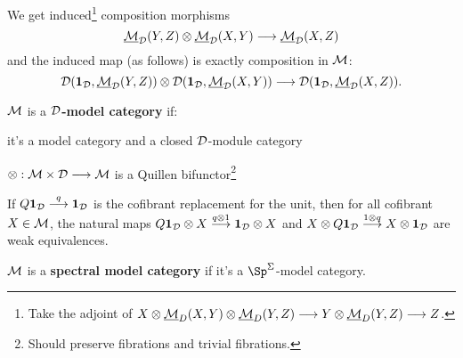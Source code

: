 \documentclass[11pt]{article}
\begin{document}
\begin{MichaelStableModelCats}
\begin{itemise}
We get induced\footnote{Take the adjoint of 
$X\otimes \underline{\mathcal{M}}_D(X,Y)\otimes\underline{\mathcal{M}}_D(Y,Z)\longrightarrow Y\otimes\underline{\mathcal{M}}_D(Y,Z)\longrightarrow Z$.} composition morphisms
\[\underline{\mathcal{M}}_{\mathcal{D}}(Y,Z)\otimes\underline{\mathcal{M}}_{\mathcal{D}}(X,Y)\longrightarrow
\underline{\mathcal{M}}_{\mathcal{D}}(X,Z)\]
and the induced map (as follows) is exactly composition in $\mathcal{M}$:
\[\mathcal{D}(\textbf{1}_{\mathcal{D}},\underline{\mathcal{M}}_{\mathcal{D}}(Y,Z))\otimes\mathcal{D}(\textbf{1}_{\mathcal{D}},\underline{\mathcal{M}}_{\mathcal{D}}(X,Y))\longrightarrow
\mathcal{D}(\textbf{1}_{\mathcal{D}},\underline{\mathcal{M}}_{\mathcal{D}}(X,Z)).\]
\item $\mathcal{M}$ is a \textbf{$\mathcal{D}$-model category} if:
\begin{itemise}
\item it's a model category and a closed $\mathcal{D}$-module category
\item $\otimes:\mathcal{M}\times\mathcal{D}\longrightarrow\mathcal{M}$ is a Quillen bifunctor\footnote{Should preserve fibrations and trivial fibrations.}
\item If $Q\textbf{1}_{\mathcal{D}}\overset{q}{\longrightarrow}\textbf{1}_{\mathcal{D}}$ is the cofibrant replacement for the unit, then for all cofibrant $X\in\mathcal{M}$, the natural maps $Q\textbf{1}_{\mathcal{D}}\otimes X\overset{q\otimes1}{\longrightarrow}\textbf{1}_{\mathcal{D}}\otimes X$ and $X\otimes Q\textbf{1}_{\mathcal{D}} \overset{1\otimes q}{\longrightarrow}X\otimes \textbf{1}_{\mathcal{D}}$ are weak equivalences.
\end{itemise}
\item $\mathcal{M}$ is a \textbf{spectral model category} if it's a $\Sp^\Sigma$-model category.
\end{itemise}


\end{MichaelStableModelCats}
\end{document}

